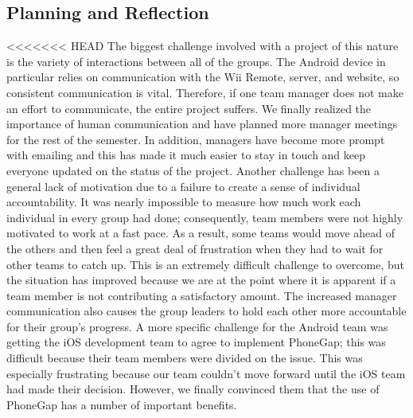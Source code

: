 \documentclass[12pt]{article}
\newenvironment{itemize*}%
  {\begin{itemize}%
  	\setlength{\parsep}{0pt}
    \setlength{\itemsep}{0pt}%
    \setlength{\parskip}{0pt}}%
  {\end{itemize}}
\begin{document}
\begin{itemize*}
\section{Planning and Reflection}
<<<<<<< HEAD
The biggest challenge involved with a project of this nature is the variety of interactions between all of the groups.  The Android device in particular relies on communication with the Wii Remote, server, and website, so consistent communication is vital.  Therefore, if one team manager does not make an effort to communicate, the entire project suffers.  We finally realized the importance of human communication and have planned more manager meetings for the rest of the semester.  In addition, managers have become more prompt with emailing and this has made it much easier to stay in touch and keep everyone updated on the status of the project.  Another challenge has been a general lack of motivation due to a failure to create a sense of individual accountability.  It was nearly impossible to measure how much work each individual in every group had done; consequently, team members were not highly motivated to work at a fast pace.  As a result, some teams would move ahead of the others and then feel a great deal of frustration when they had to wait for other teams to catch up.  This is an extremely difficult challenge to overcome, but the situation has improved because we are at the point where it is apparent if a team member is not contributing a satisfactory amount.  The increased manager communication also causes the group leaders to hold each other more accountable for their group’s progress.  A more specific challenge for the Android team was getting the iOS development team to agree to implement PhoneGap; this was difficult because their team members were divided on the issue.  This was especially frustrating because our team couldn’t move forward until the iOS team had made their decision.  However, we finally convinced them that the use of PhoneGap has a number of important benefits.


\end{itemize*}
\end{document}
